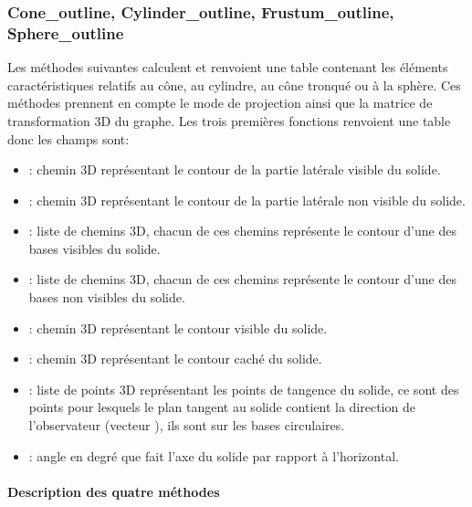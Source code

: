 \subsubsection{Cone\_outline, Cylinder\_outline, Frustum\_outline, Sphere\_outline}

Les méthodes suivantes calculent et renvoient une table contenant les éléments caractéristiques relatifs au cône, au cylindre, au cône tronqué ou à la sphère. Ces méthodes prennent en compte le mode de projection ainsi que la matrice de transformation 3D du graphe. Les trois premières fonctions renvoient une table donc les champs sont:
    \begin{itemize}
        \item {} : chemin 3D représentant le contour de la partie latérale visible du solide.
        \item {} : chemin 3D représentant le contour de la partie latérale non visible du solide.
        \item {} : liste de chemins 3D, chacun de ces chemins représente le contour d'une des bases visibles du solide.
        \item {} : liste de chemins 3D, chacun de ces chemins représente le contour d'une des bases non visibles du solide.
        \item {} : chemin 3D représentant le contour visible du solide.
        \item {} : chemin 3D représentant le contour caché du solide.
        \item {} : liste de points 3D représentant les points de tangence du solide, ce sont des points pour lesquels le plan tangent au solide contient la direction de l'observateur (vecteur ), ils sont sur les bases circulaires.
        \item {} : angle en degré que fait l'axe du solide par rapport à l'horizontal.
    \end{itemize}

\paragraph{Description des quatre méthodes}

